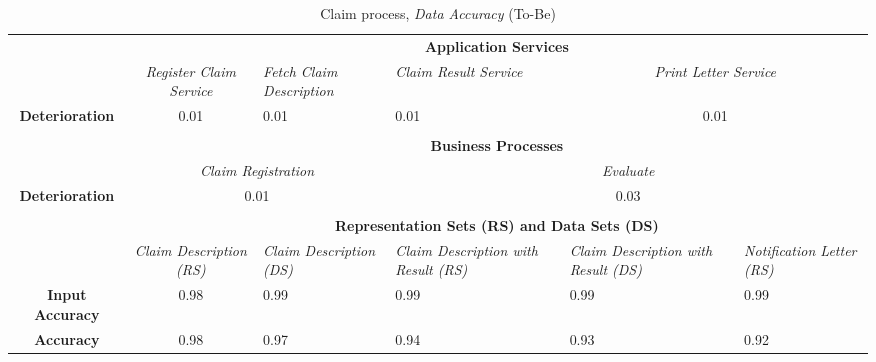 \begin{center}
\begin{table}[H]
\begin{tabular}{c|p{1.5cm}|p{1.5cm}|p{1.5cm}|p{1.5cm}|p{1.5cm}|p{1.7cm}|}


\cline{2-7}

	& \multicolumn{6}{c|}{\textbf{Application Services}} \\ \cline{2-7}
	& \multicolumn{2}{c|}{\textsl{Register Claim Service}} & \textsl{Fetch Claim Description} & \textsl{Claim Result Service} & \multicolumn{2}{c|}{\textsl{Print Letter Service}} \\ \hline
	\multicolumn{1}{|c|}{\textbf{Deterioration}} & \multicolumn{2}{c|}{0.01} & 0.01 & 0.01 & \multicolumn{2}{c|}{0.01} \\ \hline

	\multicolumn{7}{c}{} \\ \cline{2-7}
	& \multicolumn{6}{c|}{\textbf{Business Processes}} \\ \cline{2-7}
	& \multicolumn{3}{c|}{\textsl{Claim Registration}} & \multicolumn{3}{c|}{\textsl{Evaluate}} \\ \hline
	\multicolumn{1}{|c|}{\textbf{Deterioration}} & \multicolumn{3}{c|}{0.01} & \multicolumn{3}{c|}{0.03} \\ \hline

	
	\multicolumn{7}{c}{} \\ \cline{2-7}
	 & \multicolumn{6}{c|}{\textbf{Representation Sets (RS) and Data Sets (DS)}} \\ \cline{2-7}
	 & \multicolumn{2}{c|}{\textsl{Claim Description (RS)}} & \textsl{Claim Description (DS)} & \textsl{Claim Description with Result (RS)} & \textsl{Claim Description with Result (DS)} & \textsl{Notification Letter (RS)}\\
	\hline
	\multicolumn{1}{|c|}{\textbf{Input Accuracy}} & \multicolumn{2}{c|}{0.98} & 0.99 & 0.99 & 0.99 & 0.99\\ \hline
	\multicolumn{1}{|c|}{\textbf{Accuracy}} & \multicolumn{2}{c|}{0.98} & 0.97 & 0.94 & 0.93 & 0.92\\ \hline
\end{tabular}
\caption{Claim process, \textsl{Data Accuracy} (To-Be)}
\label{tab:claim_to_be}
\end{table}
\end{center}